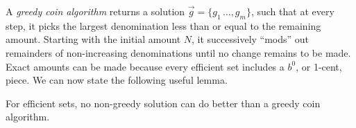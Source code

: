 \documentclass[12pt]{article}
\begin{document}

A \textit{greedy coin algorithm} returns a solution
$\vec{g} = \{g_1\,\ldots ,g_m\}$,
 such that at every
step, it picks the largest denomination less than or equal to the remaining
amount. Starting with the initial amount $N$, it successively ``mods'' out
remainders of non-increasing denominations until no change remains
to be made. Exact amounts can be made because every efficient set includes
a $b^0$, or 1-cent, piece. We can now state the
following useful lemma.

\begin{lemma}
For efficient sets, no non-greedy solution can do better than a greedy coin
algorithm.
\end{lemma}
\end{document}

